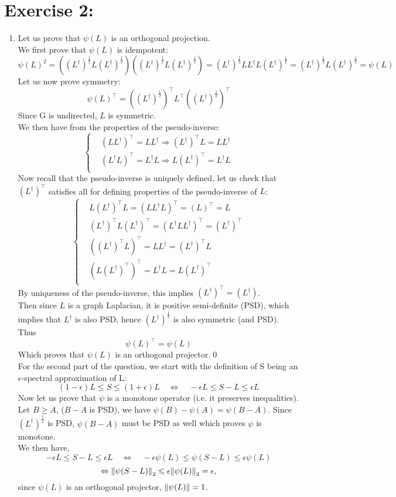 \documentclass[12pt,letterpaper]{article}
\renewcommand{\le}{\leqslant}
\renewcommand{\ge}{\geqslant}
\begin{document}
\section*{Exercise 2: }
\begin{enumerate}
    \item  
    Let us prove that $\psi(L)$ is an orthogonal projection.\\
We first prove that $\psi(L)$ is idempotent:
$$
\psi(L)^2 = \left ( (L^\dag)^{\frac{1}{2}}L(L^\dag)^{\frac{1}{2}} \right )\left ( (L^\dag)^{\frac{1}{2}}L(L^\dag)^{\frac{1}{2}} \right )
=
(L^\dag)^{\frac{1}{2}}LL^\dag L(L^\dag)^{\frac{1}{2}} 
= 
(L^\dag)^{\frac{1}{2}}L(L^\dag)^{\frac{1}{2}} 
= 
\psi(L)
$$
Let us now prove symmetry:
$$
\psi(L)^\top = ((L^\dag)^{\frac{1}{2}})^\top L^\top ((L^\dag)^{\frac{1}{2}})^\top  
$$
Since G is undirected, $L$ is symmetric. \\
We then have from the properties of the pseudo-inverse:
$$
\begin{cases}
    & (LL^\dag)^\top = LL^\dag \Rightarrow (L^{\dag})^\top L = LL^\dag \\
    & (L^\dag L)^\top = L^\dag L \Rightarrow L(L^{\dag})^\top = L^\dag L \\
\end{cases}
$$
Now recall that the pseudo-inverse is uniquely defined, let us check that $(L^\dag)^\top$ satisfies all for defining properties of the pseudo-inverse of $L$:
$$
\begin{cases}
    & L(L^\dag)^\top L = (L L^\dag L)^\top = (L)^\top = L\\
    & (L^\dag)^\top L (L^\dag)^\top = (L^\dag L L^\dag)^\top  = (L^\dag)^\top \\
    & ((L^{\dag})^\top L) ^ \top = L L^{\dag} = (L^{\dag})^\top L \\
    & (L(L^\dag)^\top )^\top = L^\dag L = L(L^{\dag})^\top\\
\end{cases}
$$
By uniqueness of the pseudo-inverse, this implies $(L^\dag)^\top = (L^\dag)$. \\
Then since $L$ is a graph Laplacian, it is positive semi-definite (PSD), which implies that $L^\dag$ is also PSD, hence $(L^\dag)^{\frac{1}{2}}$ is also symmetric (and PSD). \\
Thus 
$$
\psi(L)^\top = \psi(L)
$$
Which proves that $\psi(L)$ is an orthogonal projector.\qed \\
For the second part of the question, we start with the definition of S being an $\epsilon$-spectral approximation of L:
$$
(1-\epsilon)L \le S \le (1+\epsilon) L \quad \Leftrightarrow \quad -\epsilon L \le S - L \le \epsilon L
$$
Now let us prove that $\psi$ is a monotone operator (i.e. it preserves inequalities).
Let $B \ge A$, ($B-A$ is PSD), we have $\psi(B)-\psi(A) = \psi(B-A)$. Since $(L^\dag)^{\frac{1}{2}}$ is PSD, $\psi(B-A)$ must be PSD as well which proves $\psi$ is monotone.\\
We then have, 
$$
-\epsilon L \le S - L \le \epsilon L \quad \Leftrightarrow \quad 
-\epsilon \psi(L) \le \psi(S - L) \le \epsilon \psi(L) 
$$
$$
\Leftrightarrow  \norm{\psi(S-L)}_2 \le \epsilon \norm{\psi(L)}_2 = \epsilon,
$$
since $\psi(L)$ is an orthogonal projector, $\norm{\psi(L)}=1$. 


\end{enumerate}
\end{document}
